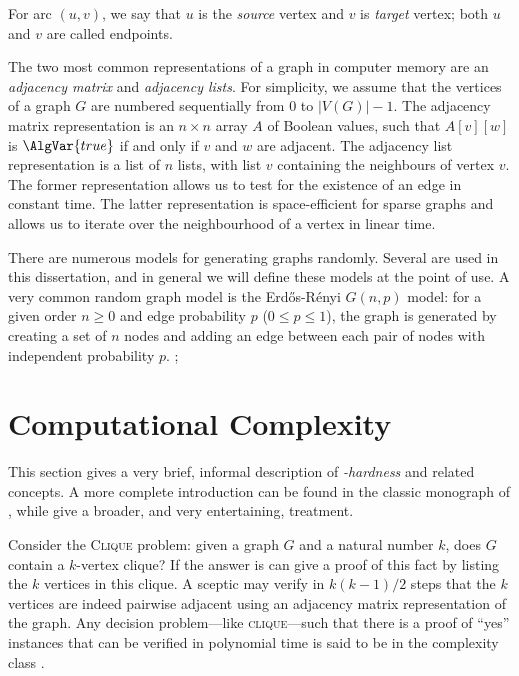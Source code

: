 For arc $(u,v)$, we say that $u$ is the \emph{source} vertex and $v$ is \emph{target}
vertex; both $u$ and $v$ are called endpoints.

The two most common representations of a graph in computer memory
are an \emph{adjacency matrix} and \emph{adjacency lists}.  For simplicity,
we assume that the vertices of a graph $G$ are numbered sequentially from
0 to $|V(G)| - 1$. The adjacency matrix representation is an $n \times n$
array $A$ of Boolean values, such that $A[v][w]$ is $\AlgVar{true}$ if and
only if $v$ and $w$ are adjacent.  The adjacency list representation
is a list of $n$ lists, with list $v$ containing the neighbours of vertex $v$.
The former representation allows us to test for the existence of an edge in constant
time.  The latter representation is space-efficient for sparse graphs
and allows us to iterate over the neighbourhood of a vertex in linear time.

There are numerous models for generating graphs randomly. Several are used
in this dissertation, and in general we will define these models at the point
of use.  A very common random graph model is the Erd\H{o}s-Rényi $G(n,p)$
model: for a given order $n \geq 0$ and edge probability $p$ ($0 \leq p \leq 1$),
the graph is generated by creating a set of $n$ nodes and adding an edge
between each pair of nodes with independent probability $p$.
 \citet{gilbert1959random}; 
\citet{erdos1960on}  \citet{moore2011nature} 

\section{Computational Complexity}\label{sec:complexity}

This section gives a very brief, informal description of
\emph{\NP-hardness} and related concepts. A more complete introduction can be
found in the classic monograph of \citet{DBLP:books/fm/GareyJ79},
while \citet{moore2011nature} give a broader, and very entertaining,
treatment.

Consider the \textsc{Clique} problem: given a graph $G$ and a natural number $k$,
does $G$ contain a $k$-vertex clique?  If the answer is 
 can give a proof
of this fact by listing the $k$ vertices in this clique.  A sceptic may verify
in $k(k-1)/2$ steps that the $k$ vertices are indeed pairwise adjacent
using an adjacency matrix representation of the graph.  Any decision
problem---like \textsc{clique}---such that there is a proof of ``yes'' instances
that can be verified in polynomial time is said to be in the complexity class \NP.

